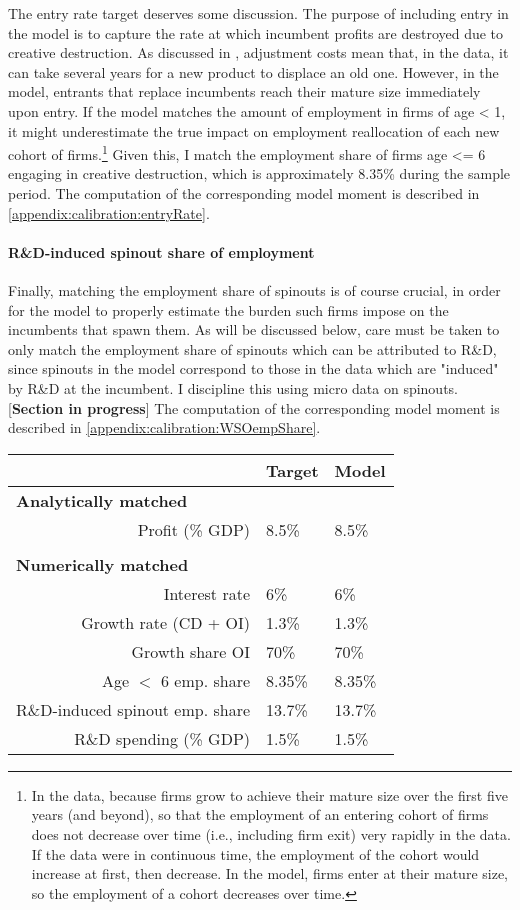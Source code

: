 \documentclass[11pt,english]{article}
\begin{document}
The entry rate target deserves some discussion. The purpose of including entry in the model is to capture the rate at which incumbent profits are destroyed due to creative destruction. As discussed in \cite{klenow_innovative_2020}, adjustment costs mean that, in the data, it can take several years for a new product to displace an old one. However, in the model, entrants that replace incumbents reach their mature size immediately upon entry. If the model matches the amount of employment in firms of age < 1, it might underestimate the true impact on employment reallocation of each new cohort of firms.\footnote{In the data, because firms grow to achieve their mature size over the first five years (and beyond), so that the employment of an entering cohort of firms does not decrease over time (i.e., including firm exit) very rapidly in the data. If the data were in continuous time, the employment of the cohort would increase at first, then decrease. In the model, firms enter at their mature size, so the employment of a cohort decreases over time.} Given this, I match the employment share of firms age <= 6 engaging in creative destruction, which is approximately 8.35\% during the sample period. The computation of the corresponding model moment is described in \ref{appendix:calibration:entryRate}.


 
\paragraph{R\&D-induced spinout share of employment}

Finally, matching the employment share of spinouts is of course crucial, in order for the model to properly estimate the burden such firms impose on the incumbents that spawn them. As will be discussed below, care must be taken to only match the employment share of spinouts which can be attributed to R\&D, since spinouts in the model correspond to those in the data which are "induced" by R\&D at the incumbent. I discipline this using micro data on spinouts. [\textbf{Section in progress}] The computation of the corresponding model moment is described in \ref{appendix:calibration:WSOempShare}.



\begin{table}[]
	\centering
	\label{calibration_targets}
	\begin{tabular}{rll}
		\toprule \toprule
		& Target & Model \tabularnewline
		\midrule
		\multicolumn{1}{l}{\textbf{Analytically matched}} & & 
		\tabularnewline
		Profit (\% GDP) & 8.5\% & 8.5\% 
		\tabularnewline
		\tabularnewline
		\multicolumn{1}{l}{\textbf{Numerically matched}} & & 
		\tabularnewline
		Interest rate & 6\% & 6\% 
		\tabularnewline
		Growth rate (CD + OI) & 1.3\% & 1.3\%
		\tabularnewline		
		Growth share OI & 70\% & 70\%
		\tabularnewline
		Age $<$ 6 emp. share  & 8.35\% & 8.35\%
		\tabularnewline
		R\&D-induced spinout emp. share & 13.7\% & 13.7\%
		\tabularnewline
		R\&D spending (\% GDP) & 1.5\% & 1.5\%
		\tabularnewline
		\bottomrule
	\end{tabular}
\end{table}
\end{document}
